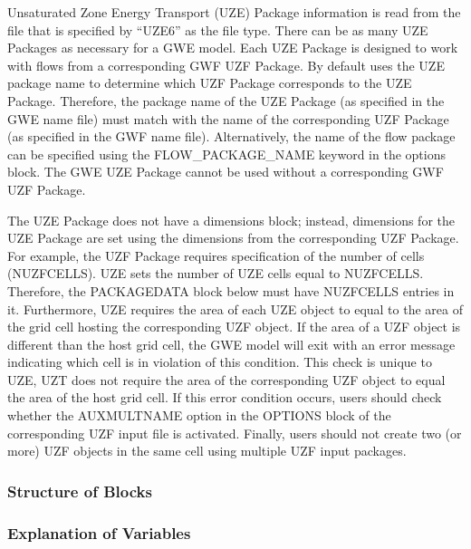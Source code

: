 Unsaturated Zone Energy Transport (UZE) Package information is read from the file that is specified by ``UZE6'' as the file type.  There can be as many UZE Packages as necessary for a GWE model. Each UZE Package is designed to work with flows from a corresponding GWF UZF Package. By default \mf uses the UZE package name to determine which UZF Package corresponds to the UZE Package.  Therefore, the package name of the UZE Package (as specified in the GWE name file) must match with the name of the corresponding UZF Package (as specified in the GWF name file).  Alternatively, the name of the flow package can be specified using the FLOW\_PACKAGE\_NAME keyword in the options block.  The GWE UZE Package cannot be used without a corresponding GWF UZF Package.

The UZE Package does not have a dimensions block; instead, dimensions for the UZE Package are set using the dimensions from the corresponding UZF Package.  For example, the UZF Package requires specification of the number of cells (NUZFCELLS).  UZE sets the number of UZE cells equal to NUZFCELLS.  Therefore, the PACKAGEDATA block below must have NUZFCELLS entries in it.  Furthermore, UZE requires the area of each UZE object to equal to the area of the grid cell hosting the corresponding UZF object.  If the area of a UZF object is different than the host grid cell, the GWE model will exit with an error message indicating which cell is in violation of this condition. This check is unique to UZE, UZT does not require the area of the corresponding UZF object to equal the area of the host grid cell.  If this error condition occurs, users should check whether the AUXMULTNAME option in the OPTIONS block of the corresponding UZF input file is activated.  Finally, users should not create two (or more) UZF objects in the same cell using multiple UZF input packages.

\vspace{5mm}
\subsubsection{Structure of Blocks}




\vspace{5mm}
\subsubsection{Explanation of Variables}
\begin{description}

\end{description}

